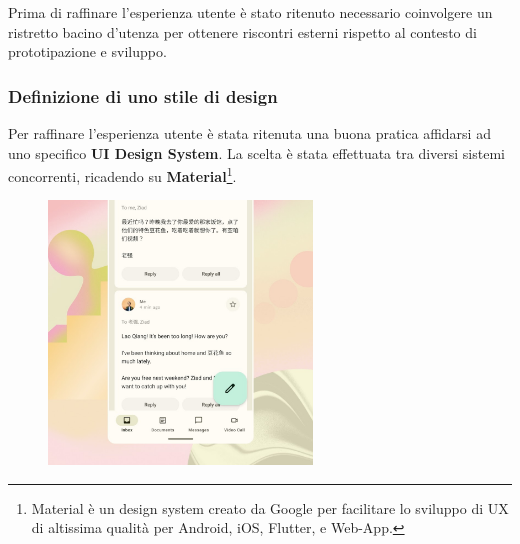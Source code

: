 \documentclass{natourDoc}
\begin{document}
Prima di raffinare l'esperienza utente è stato ritenuto necessario coinvolgere un ristretto bacino d'utenza per ottenere riscontri esterni
rispetto al contesto di prototipazione e sviluppo.

\newpage

\subsubsection{Definizione di uno stile di design}
Per raffinare l'esperienza utente è stata ritenuta una buona pratica affidarsi ad uno specifico \textbf{UI Design System}.
La scelta è stata effettuata tra diversi sistemi concorrenti, ricadendo su
\textbf{Material}\footnote{Material è un design system creato da Google per facilitare lo sviluppo di UX di altissima qualità per Android, iOS, Flutter, e Web-App.}.

\FloatBarrier
\begin{figure}[htbp!]
	\centering
	\includegraphics[height=7cm]{usability/material3.jpg}
\end{figure}
\FloatBarrier
\end{document}
